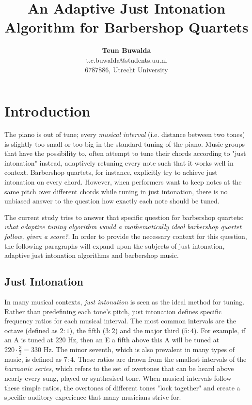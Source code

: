\documentclass[a4paper]{article}
\title{An Adaptive Just Intonation Algorithm for Barbershop Quartets}
\author{{\bf Teun Buwalda}\\t.c.buwalda@students.uu.nl\\6787886, Utrecht University}
\begin{document}
\maketitle

\section{Introduction}
The piano is out of tune; every \textit{musical interval} (i.e. distance between two tones) is slightly too small or too big in the standard tuning of the piano.\cite{van_de_craats_fis_1989} Music groups that have the possibility to, often attempt to tune their chords according to "just intonation" instead, adaptively retuning every note such that it works well in context. Barbershop quartets, for instance, explicitly try to achieve just intonation on every chord. However, when performers want to keep notes at the same pitch over different chords while tuning in just intonation, there is no unbiased answer to the question how exactly each note should be tuned.

The current study tries to answer that specific question for barbershop quartets: {\it what adaptive tuning algorithm would a mathematically ideal barbershop quartet follow, given a score?}. In order to provide the necessary context for this question, the following paragraphs will expand upon the subjects of just intonation, adaptive just intonation algorithms and barbershop music.

\subsection{Just Intonation}
\label{intro_ji}

In many musical contexts, {\it just intonation} is seen as the ideal method for tuning. Rather than predefining each tone's pitch, just intonation defines specific frequency ratios for each musical interval. The most common intervals are the octave (defined as $2:1$), the fifth ($3:2$) and the major third ($5:4$). For example, if an A is tuned at $220$ Hz, then an E a fifth above this A will be tuned at $220 \cdot \frac32 = 330$ Hz. The minor seventh, which is also prevalent in many types of music, is defined as $7:4$. These ratios are drawn from the smallest intervals of the \textit{harmonic series}, which refers to the set of overtones that can be heard above nearly every sung, played or synthesised tone. When musical intervals follow these simple ratios, the overtones of different tones "lock together" and create a specific auditory experience that many musicians strive for.
\end{document}
